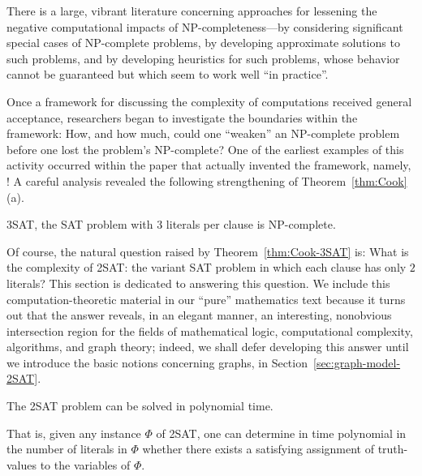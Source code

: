 \medskip

There is a large, vibrant literature concerning approaches for
lessening the negative computational impacts of {\sf
  NP}-completeness---by considering significant special cases of {\sf
  NP}-complete problems, by developing approximate solutions to such
problems, and by developing heuristics for such problems, whose
behavior cannot be guaranteed but which seem to work well ``in
practice''.

\medskip


Once a framework for discussing the complexity of computations
received general acceptance, researchers began to investigate the
boundaries within the framework: How, and how much, could one
``weaken'' an {\sf NP}-complete problem before one lost the problem's
{\sf NP}-complete?  One of the earliest examples of this activity
occurred within the paper that actually invented the framework,
namely, \cite{Cook71}!  A careful analysis revealed the following
strengthening of Theorem~\ref{thm:Cook}(a).

\begin{theorem}
\label{thm:Cook-3SAT}
{\sf 3SAT}, the {\sf SAT} problem with $3$ literals per clause is {\sf
  NP}-complete.
\end{theorem}

Of course, the natural question raised by Theorem~\ref{thm:Cook-3SAT}
is: What is the complexity of {\sf 2SAT}: the variant {\sf SAT}
problem in which each clause has only $2$ literals?
This section is dedicated to answering this question.  We include this
computation-theoretic material in our ``pure'' mathematics text
because it turns out that the answer reveals, in an elegant manner, an
interesting, nonobvious intersection region for the fields of
mathematical logic, computational complexity, algorithms, and graph
theory; indeed, we shall defer developing this answer until we 
introduce the basic notions concerning graphs, in
Section~\ref{sec:graph-model-2SAT}.

\begin{prop}
\label{thm:2SAT}
The {\sf 2SAT} problem can be solved in polynomial time.

\noindent
That is, given any instance $\Phi$ of {\sf 2SAT}, one can determine in
time polynomial in the number of literals in $\Phi$ whether there
exists a satisfying assignment of truth-values to the variables of
$\Phi$.
\end{prop}

